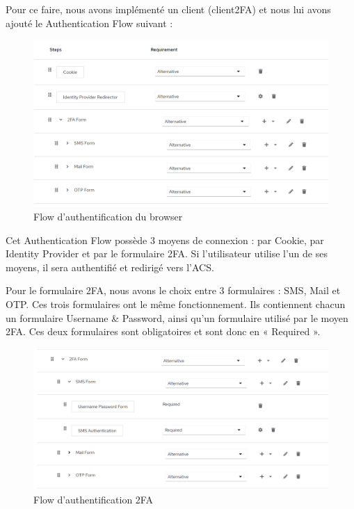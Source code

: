 Pour ce faire, nous avons implémenté un client (client2FA) et nous lui avons ajouté le Authentication
Flow suivant :

\begin{figure}[H]
    \centering
    \includegraphics[width=\textwidth]{./img/Keycloak-AuthenticationFlow-BrowserFlow.png}
    \caption{Flow d'authentification du browser}
    \label{fig:keycloak_browser_2fa}
\end{figure}

Cet Authentication Flow possède 3 moyens de connexion : par Cookie, par Identity Provider et par le
formulaire 2FA. Si l'utilisateur utilise l'un de ses moyens, il sera authentifié et redirigé vers l'ACS.

Pour le formulaire 2FA, nous avons le choix entre 3 formulaires : SMS, Mail et OTP. Ces trois
formulaires ont le même fonctionnement. Ils contiennent chacun un formulaire Username \& Password, ainsi qu'un formulaire utilisé par le moyen 2FA. Ces deux formulaires sont obligatoires et sont donc en « Required ».

\begin{figure}[H]
    \centering
    \includegraphics[width=\textwidth]{./img/Keycloak-AuthenticationFlow-2FAForm.png}
    \caption{Flow d'authentification 2FA}
    \label{fig:keycloak_flow_2fa}
\end{figure}

